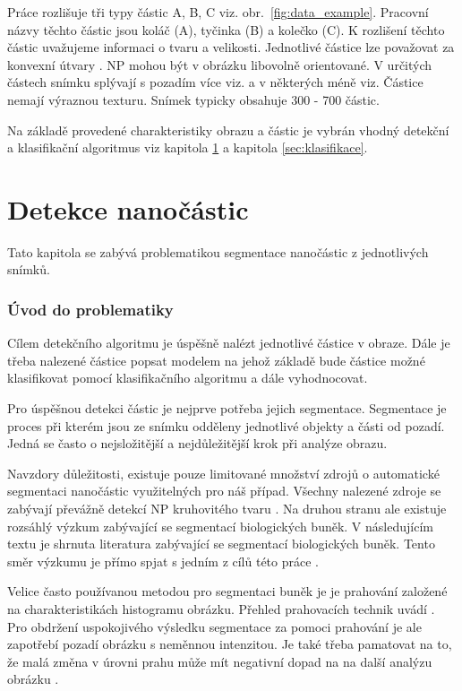 \documentclass[11pt,twoside,a4paper,table]{book}
\begin{document}
Práce rozlišuje tři typy částic A, B, C viz. obr.~\ref{fig:data_example}. Pracovní názvy těchto částic jsou koláč (A), tyčinka (B) a kolečko (C). K rozlišení těchto částic uvažujeme informaci o tvaru a velikosti. Jednotlivé částice lze považovat za konvexní útvary \cite{art:np_convex}. NP mohou být v obrázku libovolně orientované.  V určitých částech snímku splývají s pozadím více viz. a v některých méně viz. Částice nemají výraznou texturu. Snímek typicky obsahuje 300 - 700 částic.

Na základě provedené charakteristiky obrazu a částic je vybrán vhodný detekční a klasifikační algoritmus viz kapitola \ref{sec:detekce} a kapitola \ref{sec:klasifikace}.


\chapter{Detekce nanočástic}
\label{sec:detekce}
Tato kapitola se zabývá problematikou segmentace nanočástic z jednotlivých snímků.

\subsection{Úvod do problematiky}

Cílem detekčního algoritmu je úspěšně nalézt jednotlivé částice v obraze. Dále je třeba nalezené částice popsat modelem na jehož základě bude částice možné klasifikovat pomocí klasifikačního algoritmu a dále vyhodnocovat.

Pro úspěšnou detekci částic je nejprve potřeba jejich segmentace. Segmentace je proces při kterém jsou ze snímku odděleny jednotlivé objekty a části od pozadí. Jedná se často o nejsložitější a nejdůležitější krok při analýze obrazu.

Navzdory důležitosti, existuje pouze limitované množství zdrojů o automatické segmentaci nanočástic využitelných pro náš případ. Všechny nalezené zdroje se zabývají převážně detekcí NP kruhovitého tvaru \cite{art:macfarland}\cite{art:golotov}\cite{art:chen}. Na druhou stranu ale existuje rozsáhlý výzkum zabývající se segmentací biologických buněk. V následujícím textu je shrnuta literatura zabývající se segmentací biologických buněk. Tento směr výzkumu je přímo spjat s jedním z cílů této práce \cite{art:ultimate}.

Velice často používanou metodou pro segmentaci buněk je je prahování založené na charakteristikách histogramu obrázku. Přehled prahovacích technik uvádí \cite{art:sahoo88}. Pro obdržení uspokojivého výsledku segmentace za pomoci prahování je ale zapotřebí pozadí obrázku s neměnnou intenzitou. Je také třeba pamatovat na to, že malá změna v úrovni prahu může mít negativní dopad na na další analýzu obrázku \cite{art:wahlby}.
\end{document}
